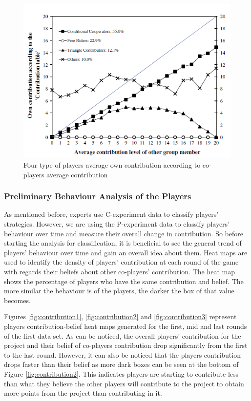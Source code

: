 \begin{figure}[!h]
	\centering
	\includegraphics[scale=0.45]{images/chapter3/percentage.png}
	\caption{Four type of players average own contribution according to co-players average contribution }
	\label{fig:percentage}
\end{figure}

\subsubsection{Preliminary Behaviour Analysis of the Players}

As mentioned before, experts use C-experiment data to classify players' strategies. However, we are using the P-experiment data to classify players' behaviour over time and measure their overall change in contribution. So before starting the analysis for classification, it is beneficial to see the general trend of players' behaviour over time and gain an overall idea about them. Heat maps are used to identify the density of players' contribution at each round of the game with regards their beliefs about other co-players' contribution. The heat map shows the percentage of players who have the same contribution and belief. The more similar the behaviour is of the players, the darker the box of that value becomes. 


Figures \ref{fig:contribution1}, \ref{fig:contribution2} and \ref{fig:contribution3} represent players contribution-belief heat maps generated for the first, mid and last rounds of the first data set. As can be noticed, the overall players' contribution for the project and their belief of co-players contribution drop significantly from the first to the last round. However, it can also be noticed that the players contribution drops faster than their belief as more dark boxes can be seen at the bottom of Figure \ref{fig:contribution2}. This indicates players are starting to contribute less than what they believe the other players will contribute to the project to obtain more points from the project than contributing in it.

